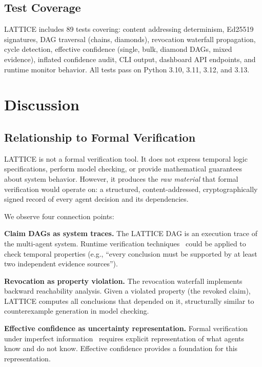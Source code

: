 \documentclass[11pt,twocolumn]{article}
\begin{document}
\subsection{Test Coverage}

LATTICE includes 89 tests covering: content addressing determinism, Ed25519 signatures, DAG traversal (chains, diamonds), revocation waterfall propagation, cycle detection, effective confidence (single, bulk, diamond DAGs, mixed evidence), inflated confidence audit, CLI output, dashboard API endpoints, and runtime monitor behavior. All tests pass on Python 3.10, 3.11, 3.12, and 3.13.

\section{Discussion}
\label{sec:discussion}

\subsection{Relationship to Formal Verification}

LATTICE is not a formal verification tool. It does not express temporal logic specifications, perform model checking, or provide mathematical guarantees about system behavior. However, it produces the \textit{raw material} that formal verification would operate on: a structured, content-addressed, cryptographically signed record of every agent decision and its dependencies.

We observe four connection points:

\textbf{Claim DAGs as system traces.} The LATTICE DAG is an execution trace of the multi-agent system. Runtime verification techniques~\cite{leucker2009brief,ferrando2025vitamin} could be applied to check temporal properties (e.g., ``every conclusion must be supported by at least two independent evidence sources'').

\textbf{Revocation as property violation.} The revocation waterfall implements backward reachability analysis. Given a violated property (the revoked claim), LATTICE computes all conclusions that depended on it, structurally similar to counterexample generation in model checking.

\textbf{Effective confidence as uncertainty representation.} Formal verification under imperfect information~\cite{belardinelli2019abstraction,belardinelli2020three} requires explicit representation of what agents know and do not know. Effective confidence provides a foundation for this representation.
\end{document}

